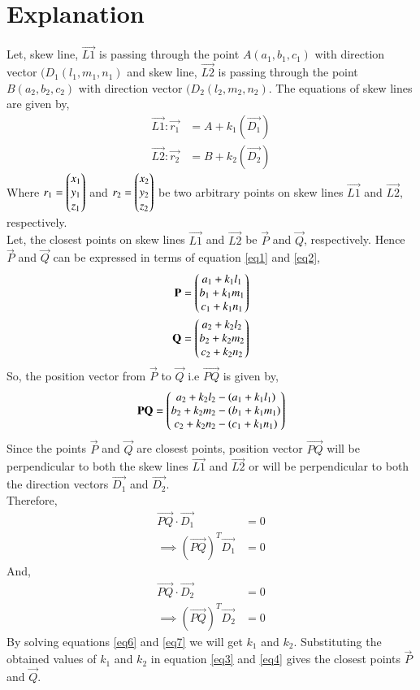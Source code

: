 \documentclass[journal,12pt,twocolumn]{IEEEtran}
\begin{document}
\section{Explanation}
Let, skew line, $\vec{L1}$ is passing through the point $A(a_1,b_1,c_1)$ with direction vector $(D_1(l_1,m_1,n_1)$ and skew line, $\vec{L2}$ is passing through the point $B(a_2,b_2,c_2)$  with direction vector $(D_2(l_2,m_2,n_2)$. The equations of skew lines are given by,
\begin{align}
\vec{L1}: \vec{r_1}&=A+k_1(\vec{D_1})\label{eq1}\\
\vec{L2}: \vec{r_2}&=B+k_2(\vec{D_2})\label{eq2}
\end{align}
Where $r_1=\begin{pmatrix}x_1\\y_1\\z_1\end{pmatrix}$ and $r_2=\begin{pmatrix}x_2\\ y_2\\z_2\end{pmatrix}$ be two arbitrary points on skew lines $\vec{L1}$ and $\vec{L2}$, respectively. \\
Let, the closest points on skew lines $\vec{L1}$ and $\vec{L2}$ be $\vec{P}$ and $\vec{Q}$, respectively. Hence $\vec{P}$ and $\vec{Q}$ can be expressed in terms of equation \eqref{eq1} and \eqref{eq2},
\begin{align}
\mathbf{P}=\begin{pmatrix}a_1+k_1l_1\\b_1+k_1m_1\\c_1+k_1n_1\end{pmatrix}\label{eq3}\\
\mathbf{Q}=\begin{pmatrix}a_2+k_2l_2\\b_2+k_2m_2\\c_2+k_2n_2\end{pmatrix}\label{eq4}
\end{align}
So, the position vector from $\vec{P}$ to $\vec{Q}$ i.e $\vec{PQ}$ is given by, 
\begin{align}
\mathbf{PQ}=\begin{pmatrix}a_2+k_2l_2-(a_1+k_1l_1)\\b_2+k_2m_2-(b_1+k_1m_1)\\
c_2+k_2n_2-(c_1+k_1n_1)\end{pmatrix}\label{eq5}
\end{align}
Since the points $\vec{P}$ and $\vec{Q}$ are closest points, position vector $\vec{PQ}$ will be perpendicular to both the skew lines $\vec{L1}$ and $\vec{L2}$ or will be perpendicular to both the direction vectors $\vec{D_1}$ and $\vec{D_2}$.\\ 
Therefore,
\begin{align}
\vec{PQ}\cdot\vec{D_1}&=0\\
\implies(\vec{PQ})^T\vec{D_1}&=0\label{eq6}
\end{align}
And,
\begin{align}
\vec{PQ}\cdot\vec{D_2}&=0\\
\implies(\vec{PQ})^T\vec{D_2}&=0\label{eq7}
\end{align}
By solving equations \ref{eq6} and \ref{eq7} we will get $k_1$ and $k_2$. Substituting the obtained values of $k_1$ and $k_2$ in equation \ref{eq3} and \ref{eq4} gives the closest points $\vec{P}$ and $\vec{Q}$.
\end{document}
